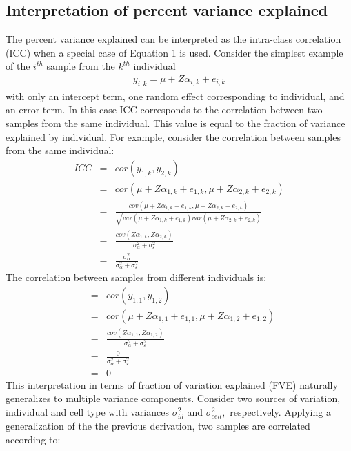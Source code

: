 \documentclass[12pt]{article}\usepackage[]{graphicx}\usepackage[]{xcolor}
\begin{document}
\subsection{Interpretation of percent variance explained}
The percent variance explained can be interpreted as the intra-class correlation (ICC) when a special case of Equation 1 is used.  Consider the simplest example of the $i^{th}$ sample from the $k^{th}$ individual 
\begin{eqnarray}
  y_{i,k} = \mu + Z \alpha_{i,k} + e_{i,k}
\end{eqnarray}
with only an intercept term, one random effect corresponding to individual, and an error term.  In this case ICC corresponds to the correlation between two samples from the same individual.  This value is equal to the fraction of variance explained by individual.  For example, consider the correlation between samples from the same individual:
\begin{eqnarray}
  ICC &=& cor( y_{1,k}, y_{2,k}) \\
      &=& cor( \mu + Z \alpha_{1,k}  + e_{1,k}, \mu + Z \alpha_{2,k}  + e_{2,k}) \\
      &=& \frac{cov( \mu + Z \alpha_{1,k}  + e_{1,k}, \mu + Z \alpha_{2,k}  + e_{2,k})}{ \sqrt{ var(\mu + Z \alpha_{1,k} + e_{1,k}) var( \mu + Z \alpha_{2,k} + e_{2,k})}}\\
      &=& \frac{cov(Z \alpha_{1,k}, Z \alpha_{2,k})}{\sigma^2_\alpha + \sigma^2_\varepsilon} \\
      &=& \frac{\sigma^2_\alpha}{\sigma^2_\alpha + \sigma^2_\varepsilon}
\end{eqnarray}
The correlation between samples from different individuals is:
\begin{eqnarray}
  &=& cor( y_{1,1}, y_{1,2}) \\
      &=& cor( \mu + Z \alpha_{1,1} + e_{1,1}, \mu + Z \alpha_{1,2}  + e_{1,2}) \\
      &=& \frac{cov(Z \alpha_{1,1}, Z \alpha_{1,2})}{\sigma^2_\alpha + \sigma^2_\varepsilon} \\
      &=& \frac{0}{\sigma^2_\alpha + \sigma^2_\varepsilon} \\
      &=& 0
\end{eqnarray}
This interpretation in terms of fraction of variation explained (FVE) naturally generalizes to multiple variance components.  Consider two sources of variation, individual and cell type with variances $\sigma^2_{id}$ and $\sigma^2_{cell},$ respectively.  Applying a generalization of the the previous derivation, two samples are correlated according to:
\end{document}

